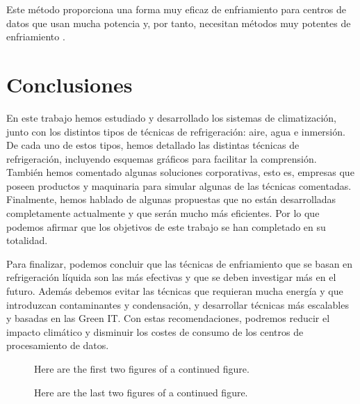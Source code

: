 Este método proporciona una forma muy eficaz de enfriamiento para centros de datos que usan mucha potencia y, por tanto, necesitan métodos muy potentes de enfriamiento \cite{datacenters-future}.

\chapter{Conclusiones}

En este trabajo hemos estudiado y desarrollado los sistemas de climatización, junto con los distintos tipos de técnicas de refrigeración: aire, agua e inmersión. De cada uno de estos tipos, hemos detallado las distintas técnicas de refrigeración, incluyendo esquemas gráficos para facilitar la comprensión. También hemos comentado algunas soluciones corporativas, esto es, empresas que poseen productos y maquinaria para simular algunas de las técnicas comentadas. Finalmente, hemos hablado de algunas propuestas que no están desarrolladas completamente actualmente y que serán mucho más eficientes. Por lo que podemos afirmar que los objetivos de este trabajo se han completado en su totalidad.

Para finalizar, podemos concluir que las técnicas de enfriamiento que se basan en refrigeración líquida son las más efectivas y que se deben investigar más en el futuro. Además debemos evitar las técnicas que requieran mucha energía y que introduzcan contaminantes y condensación, y desarrollar técnicas más escalables y basadas en las Green IT. Con estas recomendaciones, podremos reducir el impacto climático y disminuir los costes de consumo de los centros de procesamiento de datos.


\begin{figure}%
    \centering
    \qquad
    \caption{Here are the first two figures of a continued figure.}%
    \label{fig:cont}%
\end{figure}

\begin{figure}%
    \ContinuedFloat
    \centering
    \qquad
    \caption[]{Here are the last two figures of a continued figure.}%
    \label{fig:cont}%
\end{figure}